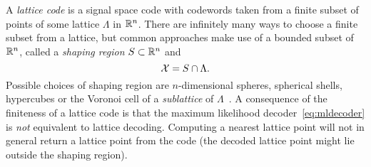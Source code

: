 \documentclass[draftcls, onecolumn, 11pt]{IEEEtran}
\begin{document}

A \emph{lattice code} is a signal space code with codewords taken from a finite subset of points of some lattice $\Lambda$ in ${\mathbb R}^n$. There are infinitely many ways to choose a finite subset from a lattice, but common approaches make use of a bounded subset of ${\mathbb R}^n$, called a \emph{shaping region} $S \subset {\mathbb R}^n$ and
\[
\mathcal X = S \cap \Lambda.
\]
Possible choices of shaping region are $n$-dimensional spheres, spherical shells, hypercubes or the Voronoi cell of a \emph{sublattice} of $\Lambda$~\cite{Buda1989_some_opt_codes_structure,Erex2004_lattice_decoding,Conway1983VoronoiCodes}.  A consequence of the finiteness of a lattice code is that the maximum likelihood decoder~\eqref{eq:mldecoder} is \emph{not} equivalent to lattice decoding.  Computing a nearest lattice point will not in general return a lattice point from the code (the decoded lattice point might lie outside the shaping region).
\end{document}
